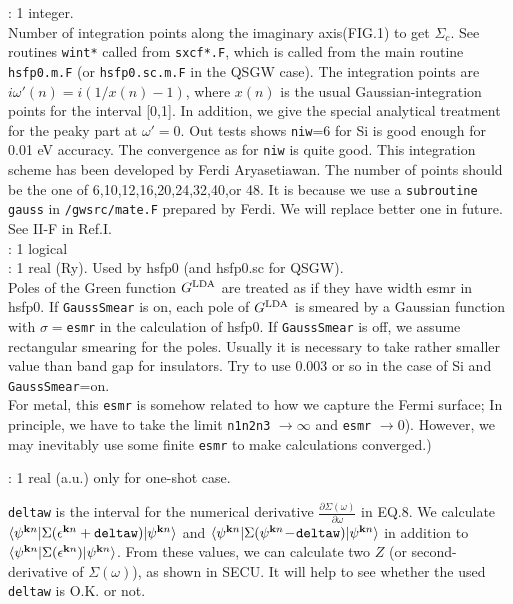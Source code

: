 \documentclass[a4paper,10pt,epsf,fleqn]{article}
\newcommand{\keyw}[1]{\fbox{\tt #1}}
\begin{document}
{\begin{enumerate}
\keyw{niw} : 1 integer. \\
Number of integration points along the imaginary axis(FIG.1)
to get $\Sigma_c$.
See routines {\tt wint*} called from {\tt sxcf*.F},
which is called from the main routine {\tt hsfp0.m.F} (or {\tt hsfp0.sc.m.F} in the QSGW case).
The integration points are
$i \omega'(n)= i( 1/x(n) -1)$, where $x(n)$ is
the usual Gaussian-integration points for the interval [0,1].
In addition, we give the special analytical treatment for
the peaky part at $\omega'=0$.
Out tests shows {\tt niw}=6 for Si is good enough for 0.01 eV accuracy.
The convergence as for {\tt niw} is quite good.
This integration scheme has been developed by Ferdi Aryasetiawan.
The number of points should be the one of 6,10,12,16,20,24,32,40,or 48. 
It is because we use a {\tt subroutine gauss} in {\tt /gwsrc/mate.F} 
prepared by Ferdi. We will replace better one in future.
See II-F in Ref.I.\\

\keyw{GaussSmear} : 1 logical \\
\keyw{esmr} : 1 real (Ry). Used by hsfp0 (and hsfp0.sc for QSGW). \\
Poles of  the Green function $G^{\rm LDA}$ are treated as 
if they have width esmr in hsfp0.
If {\tt GaussSmear} is on, each pole of $G^{\rm LDA}$
is smeared by a Gaussian function with $\sigma=${\tt esmr} in the
 calculation of hsfp0. 
If {\tt GaussSmear} is off, we assume rectangular smearing for the poles.
Usually it is necessary to take rather smaller value than band gap 
for insulators. Try to use 0.003 or so in the case of Si and {\tt GaussSmear}=on.\\
For metal, this {\tt esmr} is somehow related to how we capture the
Fermi surface; In principle, we have to take the limit 
{\tt n1n2n3} $\to \infty$ and
{\tt esmr} $\to 0$). However, we may inevitably use some finite 
{\tt esmr} to make calculations converged.)


\keyw{deltaw}: 1 real (a.u.) only for one-shot case.

{\tt deltaw} is the interval for the numerical derivative
$\frac{\partial \Sigma(\omega)}{\partial \omega}$ in EQ.8.
We calculate $\langle \psi^{{\bf k}n} |\Sigma(\epsilon^{{\bf k}n}+{\tt deltaw}) |\psi^{{\bf k}n} \rangle$ 
and $\langle \psi^{{\bf k}n} |\Sigma(\psi^{{\bf k}n}\!-\!{\tt deltaw})|\psi^{{\bf k}n} \rangle$
in addition to $\langle \psi^{{\bf k}n} |\Sigma(\epsilon^{{\bf k}n})|\psi^{{\bf k}n} \rangle$.
From these values, we can calculate two $Z$ (or second-derivative of $\Sigma(\omega)$), as shown
in {\sf SECU}. It will help to see whether the used \verb#deltaw# is O.K. or not.


\end{enumerate}}
\end{document}
